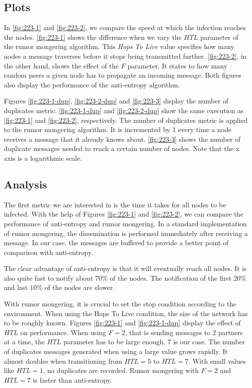 \documentclass[11pt,a4paper]{scrartcl}
\begin{document}
\subsection{Plots}

In \autoref{fig:223-1} and \autoref{fig:223-2}, we compare the speed at which the infection reaches the nodes. \autoref{fig:223-1} shows the difference when we vary the $HTL$ parameter of the rumor mongering algorithm. This \textit{Hops To Live} value specifies how many nodes a message traverses before it stops being transmitted further. \autoref{fig:223-2}, in the other hand, shows the effect of the $F$ parameter. It states to how many random peers a given node has to propagate an incoming message. Both figures also display the performance of the anti-entropy algorithm.

Figures \ref{fig:223-1-dup}, \ref{fig:223-2-dup} and \ref{fig:223-3} display the number of duplicates metric. \autoref{fig:223-1-dup} and \ref{fig:223-2-dup} show the same execution as \autoref{fig:223-1} and \ref{fig:223-2}, respectively. The number of duplicates metric is applied to the rumor mongering algorithm. It is incremented by 1 every time a node receives a message that it already knows about. \autoref{fig:223-3} shows the number of duplicate messages needed to reach a certain number of nodes. Note that the x axis is a logarithmic scale.

\subsection{Analysis}
\label{subsec:gossip-analysis}

The first metric we are interested in is the time it takes for all nodes to be infected. With the help of Figures \ref{fig:223-1} and \ref{fig:223-2}, we can compare the performance of anti-entropy and rumor mongering. In a standard implementation of rumor mongering, the dissemination is performed immediately after receiving a message. In our case, the messages are buffered to provide a better point of comparison with anti-entropy.

The clear advantage of anti-entropy is that it will eventually reach all nodes. It is also quite fast to notify about $70\%$ of the nodes. The notification of the first $20\%$ and last $10\%$ of the nodes are slower.

With rumor mongering, it is crucial to set the stop condition according to the environment. When using the Hops To Live condition, the size of the network has to be roughly known. Figures \ref{fig:223-1} and \ref{fig:223-1-dup} display the effect of $HTL$ on performance. When using $F=2$, that is sending messages to 2 partners at a time, the $HTL$ parameter has to be large enough, 7 is our case. The number of duplicates messages generated when using a large value grows rapidly. It almost doubles when transitioning from $HTL=5$ to $HTL=7$. With small values like $HTL=1$, no duplicates are recorded. Rumor mongering with $F=2$ and $HTL=7$ is faster than anti-entropy.
\end{document}
